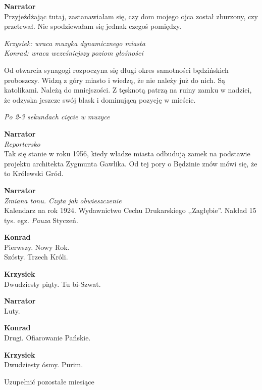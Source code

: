 \documentclass[11pt,a4paper,oneside]{article}
\begin{document}
\textbf{Narrator}\\
Przyjeżdżając tutaj, zastanawiałam się, czy dom mojego ojca został
zburzony,  czy
przetrwał. Nie spodziewałam się jednak czegoś pomiędzy.

{\color{krzysiek} \emph{Krzysiek: wraca muzyka dynamicznego miasta}}\\
{\color{konrad}   \emph{Konrad: wraca wcześniejszy poziom głośności}}

Od otwarcia synagogi rozpoczyna się długi okres samotności będzińskich
proboszczy. Widzą z góry miasto i wiedzą, że nie należy już do nich.
Są katolikami. Należą do mniejszości. Z tęsknotą patrzą na ruiny zamku
w nadziei, że odzyska jeszcze swój blask i dominującą pozycję
w mieście. 

{\color{light-gray} \emph{Po 2-3 sekundach cięcie w muzyce}}

\textbf{Narrator}\\
{\color{light-gray} \emph{Reportersko}}\\
Tak się stanie w roku 1956, kiedy władze miasta odbudują zamek na
podstawie projektu architekta Zygmunta Gawlika. Od tej pory o Będzinie
znów mówi się, że to Królewski Gród.

\textbf{Narrator}\\
{\color{light-gray} \emph{Zmiana tonu. Czyta jak obwieszczenie}}\\
Kalendarz na rok 1924. Wydawnictwo Cechu Drukarskiego ,,Zagłębie''.
Nakład 15 tys. egz. {\color{light-gray} \emph{Pauza}} Styczeń.

{\color{konrad}
\textbf{Konrad}\\
Pierwszy. Nowy Rok. \\
Szósty. Trzech Króli.
}

{\color{krzysiek}
\textbf{Krzysiek}\\
Dwudziesty piąty. Tu bi-Szwat. %
}

\textbf{Narrator}\\
Luty.

{\color{konrad}
\textbf{Konrad}\\
Drugi. Ofiarowanie Pańskie.
}

{\color{krzysiek}
\textbf{Krzysiek}\\
Dwudziesty ósmy. Purim.
}

{\color{red} Uzupełnić pozostałe miesiące}
\end{document}
